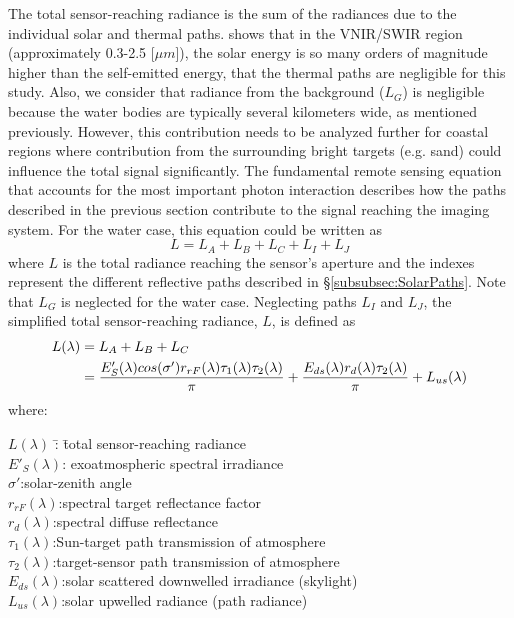 The total sensor-reaching radiance is the sum of the radiances due to the individual solar and thermal paths.  \citet{Schott} shows that in the VNIR/SWIR region (approximately 0.3-2.5 [$\mu m$]), the solar energy is so many orders of magnitude higher than the self-emitted energy, that the thermal paths are negligible for this study. Also, we consider that radiance from the background ($L_G$) is negligible because the water bodies are typically several kilometers wide, as mentioned previously. However, this contribution needs to be analyzed further for coastal regions where contribution from the surrounding bright targets (e.g. sand) could influence the total signal significantly. The fundamental remote sensing equation that accounts for the most important photon interaction describes how the paths described in the previous section contribute to the signal reaching the imaging system. For the water case, this equation could be written as \citep{Schott}
\begin{equation}
   L = L_A+L_B+L_C+L_I+L_J
\end{equation} 
where $L$ is the total radiance reaching the sensor's aperture and the indexes represent the different reflective paths described in \S\ref{subsubsec:SolarPaths}. Note that $L_G$ is neglected for the water case. Neglecting paths $L_I$ and $L_J$, the simplified total sensor-reaching radiance, $L$, is defined as 
\begin{align} \label{eq:gov1} 
L(\lambda)  &=L_A+L_B+L_C\notag\\
            &= \frac{E'_S(\lambda)cos(\sigma')r_{rF}(\lambda)\tau_1(\lambda)\tau_2(\lambda)}{\pi} + \frac{E_{ds}(\lambda)r_d(\lambda)\tau_2(\lambda)}{\pi} + L_{us}(\lambda)
\end{align} 
where:
\begin{tabbing}
\indent \indent \indent  $L(\lambda)$ \hspace{1mm}\=:  \indent \= total sensor-reaching radiance\\
\indent \indent \indent  $E'_S(\lambda)$\>: \>exoatmospheric spectral irradiance\\
\indent \indent \indent $\sigma'$\>:\>solar-zenith angle\\
\indent \indent \indent $r_{rF}(\lambda)$\>:\>spectral target reflectance factor\\
\indent \indent \indent $r_d(\lambda)$\>:\>spectral diffuse reflectance\\
\indent \indent \indent $\tau_1(\lambda)$\>:\>Sun-target path transmission of atmosphere\\
\indent \indent \indent $\tau_2(\lambda)$\>:\>target-sensor path transmission of atmosphere\\
\indent \indent \indent $E_{ds}(\lambda)$\>:\>solar scattered downwelled irradiance (skylight)\\
\indent \indent \indent $L_{us}(\lambda)$\>:\>solar upwelled radiance (path radiance)\\
\end{tabbing}
